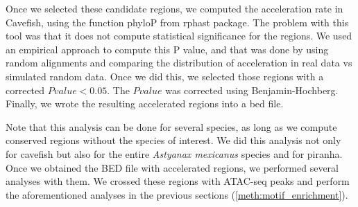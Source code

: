Once we selected these candidate regions, we computed the acceleration rate in Cavefish, using the function phyloP from rphast package. The problem with this tool was that it does not compute statistical significance for the regions. We used an empirical approach to compute this P value, and that was done by using random alignments and comparing the distribution of acceleration in real data vs simulated random data. Once we did this, we selected those regions with a corrected $P value < 0.05$. The $P value$ was corrected using Benjamin-Hochberg. Finally, we wrote the resulting accelerated regions into a bed file.

Note that this analysis can be done for several species, as long as we compute conserved regions without the species of interest. We did this analysis not only for cavefish but also for the entire \textit{Astyanax mexicanus} species and for piranha. Once we obtained the BED file with accelerated regions, we performed several analyses with them. We crossed these regions with ATAC-seq peaks and perform the aforementioned analyses in the previous sections (\ref{meth:motif_enrichment}).